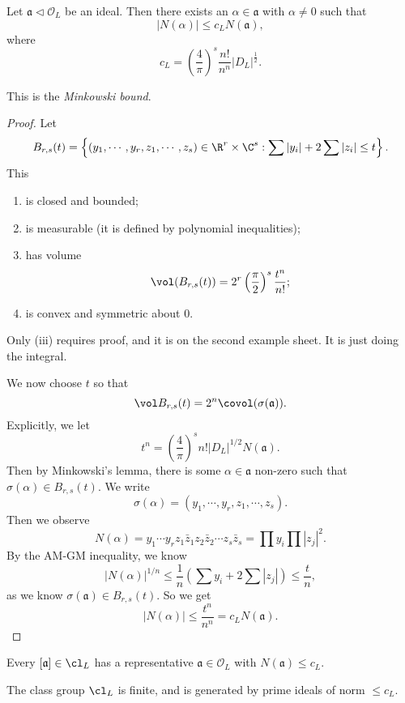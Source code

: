 \documentclass[a4paper]{article}
\begin{document}
\begin{prop}
  Let $\mathfrak{a} \lhd \mathcal{O}_L$ be an ideal. Then there exists an $\alpha \in \mathfrak{a}$ with $\alpha \not= 0$ such that
  \[
    |N(\alpha)| \leq c_L N(\mathfrak{a}),
  \]
  where
  \[
    c_L = \left(\frac{4}{\pi}\right)^s \frac{n!}{n^n} |D_L|^{\frac{1}{2}}.
  \]
\end{prop}
This is the \emph{Minkowski bound}.

\begin{proof}
  Let
  \[
    B_{r, s}(t) = \left\{(y_1, \cdots, y_r, z_1, \cdots, z_s) \in \R^r \times \C^s: \sum |y_i| + 2 \sum |z_i| \leq t\right\}.
  \]
  This
  \begin{enumerate}
    \item is closed and bounded;
    \item is measurable (it is defined by polynomial inequalities);
    \item has volume
      \[
        \vol(B_{r, s}(t)) = 2^r \left(\frac{\pi}{2}\right)^s \frac{t^n}{n!};
      \]
    \item is convex and symmetric about $0$.
  \end{enumerate}
  Only (iii) requires proof, and it is on the second example sheet. It is just doing the integral.

  We now choose $t$ so that
  \[
    \vol B_{r, s}(t) = 2^n \covol(\sigma(\mathfrak{a})).
  \]
  Explicitly, we let
  \[
    t^n = \left(\frac{4}{\pi}\right)^s n! |D_L|^{1/2}N(\mathfrak{a}).
  \]
  Then by Minkowski's lemma, there is some $\alpha \in \mathfrak{a}$ non-zero such that $\sigma(\alpha) \in B_{r, s}(t)$. We write
  \[
    \sigma(\alpha) = (y_1, \cdots, y_r, z_1, \cdots, z_s).
  \]
  Then we observe
  \[
    N(\alpha) = y_1\cdots y_r z_1 \bar{z}_1 z_2 \bar{z}_2 \cdots z_s \bar{z}_s = \prod y_i \prod|z_j|^2.
  \]
  By the AM-GM inequality, we know
  \[
    |N(\alpha)|^{1/n} \leq \frac{1}{n}\left(\sum y_i + 2 \sum |z_j|\right) \leq \frac{t}{n},
  \]
  as we know $\sigma(\mathfrak{a}) \in B_{r, s}(t)$. So we get
  \[
    |N(\alpha)| \leq \frac{t^n}{n^n} = c_L N(\mathfrak{a}).
  \]
\end{proof}

\begin{cor}
  Every $[\mathfrak{a}] \in \cl_L$ has a representative $\mathfrak{a} \in \mathcal{O}_L$ with $N(\mathfrak{a}) \leq c_L$.
\end{cor}

\begin{thm}[Dirichlet]
  The class group $\cl_L$ is finite, and is generated by prime ideals of norm $\leq c_L$.
\end{thm}
\end{document}

